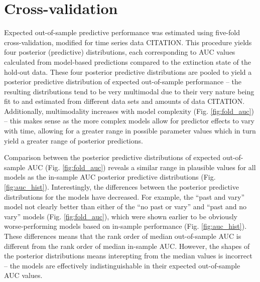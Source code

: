 \documentclass[12pt,letterpaper]{article}
\begin{document}
\section{Cross-validation}

Expected out-of-sample predictive performance was estimated using five-fold cross-validation, modified for time series data CITATION. This procedure yields four posterior (predictive) distributions, each corresponding to AUC values calculated from model-based predictions compared to the extinction state of the hold-out data. These four posterior predictive distributions are pooled to yield a posterior predictive distribution of expected out-of-sample performance -- the resulting distributions tend to be very multimodal due to their very nature being fit to and estimated from different data sets and amounts of data CITATION. Additionally, multimodality increases with model complexity (Fig. \ref{fig:fold_auc}) -- this makes sense as the more complex models allow for predictor effects to vary with time, allowing for a greater range in possible parameter values which in turn yield a greater range of posterior predictions.

Comparison between the posterior predictive distributions of expected out-of-sample AUC (Fig. \ref{fig:fold_auc}) reveals a similar range in plausible values for all models as the in-sample AUC posterior predictive distributions (Fig. \ref{fig:auc_hist}). Interestingly, the differences between the posterior predictive distributions for the models have decreased. For example, the ``past and vary'' model not clearly better than either of the ``no past or vary'' and ``past and no vary'' models (Fig. \ref{fig:fold_auc}), which were shown earlier to be obviously worse-performing models based on in-sample performance (Fig. \ref{fig:auc_hist}). These differences means that the rank order of median out-of-sample AUC is different from the rank order of median in-sample AUC. However, the shapes of the posterior distributions means interepting from the median values is incorrect -- the models are effectively indistinguishable in their expected out-of-sample AUC values.
\end{document}
